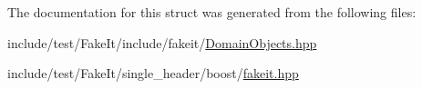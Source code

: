 The documentation for this struct was generated from the following files\+:\begin{DoxyCompactItemize}
\item 
include/test/\+Fake\+It/include/fakeit/\mbox{\hyperlink{DomainObjects_8hpp}{Domain\+Objects.\+hpp}}\item 
include/test/\+Fake\+It/single\+\_\+header/boost/\mbox{\hyperlink{single__header_2boost_2fakeit_8hpp}{fakeit.\+hpp}}\end{DoxyCompactItemize}

